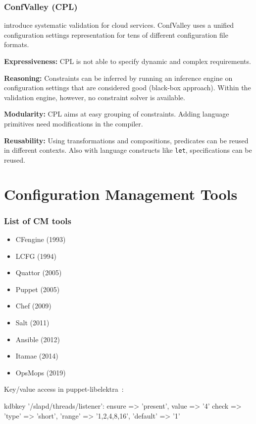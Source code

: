 \begin{frame}
	\frametitle{ConfValley (CPL)}

	\citet{huang2015confvalley} introduce systematic validation for cloud services.
	ConfValley uses a unified configuration settings representation for tens of different configuration file formats.

	\textbf{Expressiveness:}
	CPL is not able to specify dynamic and complex requirements.

	\textbf{Reasoning:}
	Constraints can be inferred by running an inference engine on configuration settings that are considered good (black-box approach).
	Within the validation engine, however, no constraint solver is available.

	\textbf{Modularity:}
	CPL aims at easy grouping of constraints.
	Adding language primitives need modifications in the compiler.

	\textbf{Reusability:}
	Using transformations and compositions, predicates can be reused in different contexts.
	Also with language constructs like \texttt{let}, specifications can be reused.
\end{frame}




\section{Configuration Management Tools}

\begin{frame}
	\frametitle{List of CM tools}

	\begin{itemize}[<+-| alert@+>]
	\item CFengine (1993)
	\item LCFG (1994)
	\item Quattor (2005)
	\item Puppet (2005)
	\item Chef (2009)
	\item Salt (2011)
	\item Ansible (2012)
	\item Itamae (2014)
	\item OpsMops (2019)
	\end{itemize}
\end{frame}

\begin{frame}[fragile]
	Key/value access in puppet-libelektra~\cite{raab2020unified}:
	\vspace{0.5cm}

	\begin{code}[morekeywords={kdbkey,kdbmount,ensure,value},gobble=4]
	kdbkey {'/slapd/threads/listener':
		ensure => 'present',
		value => '4'
		check => {
			'type' => 'short',
			'range' => '1,2,4,8,16',
			'default' => '1'
		}
	}
	\end{code}
\end{frame}

